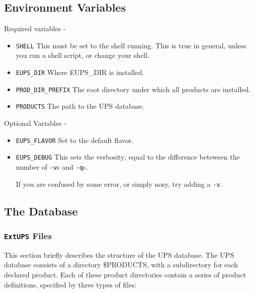 \documentclass{article}
\newcommand{\code}[1]{\texttt{#1}}
\newcommand{\eups}{\code{ExtUPS}}
\begin{document}
\subsection{Environment Variables}

Required variables -

\begin{itemize}
  \item \texttt{SHELL}
    This must be set to the shell running. This is true in general, unless
    you run a shell script, or change your shell.

  \item \texttt{EUPS\_DIR}
    Where EUPS\_DIR is installed.

  \item \texttt{PROD\_DIR\_PREFIX}
    The root directory under which all products are installed.

  \item \texttt{PRODUCTS}
    The path to the UPS database.
\end{itemize}

Optional Variables -

\begin{itemize}
  \item \texttt{EUPS\_FLAVOR}
    Set to the default flavor.

  \item \texttt{EUPS\_DEBUG}
    This sets the verbosity; equal to the difference beteween the number of \texttt{-v}s
    and \texttt{-q}s.

    If you are confused by some error, or simply nosy, try adding a \texttt{-v}.
\end{itemize}

\subsection{The Database}

\subsubsection{\eups{} Files}

This section briefly describes the structure of the UPS database. The UPS database
consists of a directory \$PRODUCTS, with a subdirectory for each declared product.
Each of these product directories contain a series of product definitions, specified
by three types of files:
\end{document}
